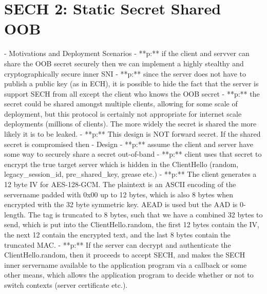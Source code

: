 \section{SECH 2: Static Secret Shared OOB}
  - Motivations and Deployment Scenarios
    - **p:** if the client and servver can share the OOB secret securely then we can implement a highly stealthy and cryptographically secure inner SNI
    - **p:** since the server does not have to publish a public key (as in ECH), it is possible to hide the fact that the server is support SECH from all except the client who knows the OOB secret
    - **p:** the secret could be shared amongst multiple clients, allowing for some scale of deployment, but this protocol is certainly not appropriate for internet scale deployments (millions of clients). The more widely the secret is shared the more likely it is to be leaked.
    - **p:** This design is NOT forward secret. If the shared secret is compromised then 
  - Design
    - **p:** assume the client and server have some way to securely share a secret out-of-band
    - **p:** client uses that secret to encrypt the true target server which is hidden in the ClientHello (random, legacy_session_id, pre_shared_key, grease etc.)
    - **p:** The client generates a 12 byte IV for AES-128-GCM. The plaintext is an ASCII encoding of the servername padded with 0x00 up to 12 bytes, which is also 8 bytes when encrypted with the 32 byte symmetric key. AEAD is used but the AAD is 0-length. The tag is truncated to 8 bytes, such that we have a combined 32 bytes to send, which is put into the ClientHello.random, the first 12 bytes contain the IV, the next 12 contain the encrypted text, and the last 8 bytes contain the truncated MAC.
    - **p:** If the server can decrypt and authenticate the ClientHello.random, then it proceeds to accept SECH, and makes the SECH inner servername available to the application program via a callback or some other means, which allows the application program to decide whether or not to switch contexts (server certificate etc.).
